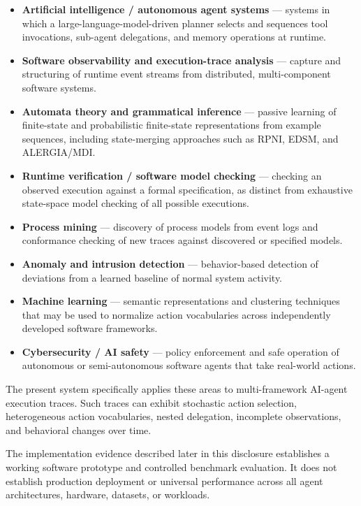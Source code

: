 \documentclass[11pt,a4paper]{article}
\begin{document}
\begin{itemize}[leftmargin=1.4em]
\item \textbf{Artificial intelligence / autonomous agent systems} --- systems in which a
large-language-model-driven planner selects and sequences tool invocations, sub-agent
delegations, and memory operations at runtime.

\item \textbf{Software observability and execution-trace analysis} --- capture and
structuring of runtime event streams from distributed, multi-component software systems.

\item \textbf{Automata theory and grammatical inference} --- passive learning of finite-state
and probabilistic finite-state representations from example sequences, including
state-merging approaches such as RPNI, EDSM, and ALERGIA/MDI.

\item \textbf{Runtime verification / software model checking} --- checking an observed
execution against a formal specification, as distinct from exhaustive state-space model
checking of all possible executions.

\item \textbf{Process mining} --- discovery of process models from event logs and
conformance checking of new traces against discovered or specified models.

\item \textbf{Anomaly and intrusion detection} --- behavior-based detection of deviations
from a learned baseline of normal system activity.

\item \textbf{Machine learning} --- semantic representations and clustering techniques
that may be used to normalize action vocabularies across independently developed software
frameworks.

\item \textbf{Cybersecurity / AI safety} --- policy enforcement and safe operation of
autonomous or semi-autonomous software agents that take real-world actions.
\end{itemize}

The present system specifically applies these areas to multi-framework AI-agent execution
traces. Such traces can exhibit stochastic action selection, heterogeneous action
vocabularies, nested delegation, incomplete observations, and behavioral changes over
time.

The implementation evidence described later in this disclosure establishes a working
software prototype and controlled benchmark evaluation. It does not establish production
deployment or universal performance across all agent architectures, hardware, datasets,
or workloads.
\end{document}
